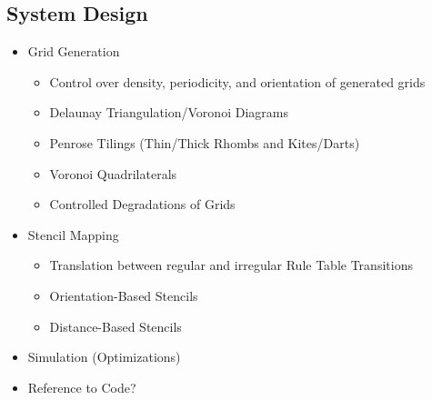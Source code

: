 \documentclass[a4paper, 11pt]{article}
\begin{document}
\subsection*{System Design}
\begin{itemize}

\item Grid Generation
\begin{itemize}
\item Control over density, periodicity, and orientation of generated grids

\item Delaunay Triangulation/Voronoi Diagrams

\item Penrose Tilings (Thin/Thick Rhombs and Kites/Darts)

\item Voronoi Quadrilaterals

\item Controlled Degradations of Grids
\end{itemize}

\item Stencil Mapping

\begin{itemize}
\item Translation between regular and irregular Rule Table Transitions

\item Orientation-Based Stencils

\item Distance-Based Stencils
\end{itemize}

\item Simulation (Optimizations)

\item Reference to Code?

\end{itemize}
\end{document}
